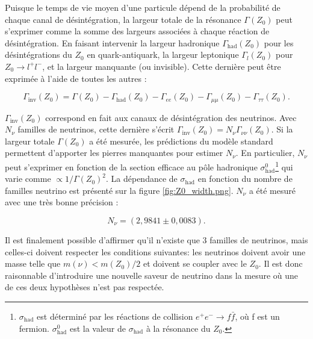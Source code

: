 \bigbreak

Puisque le temps de vie moyen d'une particule dépend de la probabilité de chaque canal de désintégration, la largeur totale de la résonance $\Gamma(Z_0)$ peut s'exprimer comme la somme des largeurs associées à chaque réaction de désintégration. En faisant intervenir la largeur hadronique $\Gamma_\textrm{had}(Z_0)$ pour les désintégrations du $Z_0$ en quark-antiquark, la largeur leptonique $\Gamma_l(Z_0)$ pour $Z_0 \rightarrow l^+l^-$, et la largeur manquante (ou invisible). Cette dernière peut être exprimée à l'aide de toutes les autres :

\begin{equation}
    \Gamma_\textrm{inv}(Z_0) = \Gamma(Z_0) - \Gamma_\textrm{had}(Z_0) - \Gamma_{ee}(Z_0) - \Gamma_{\mu\mu}(Z_0) - \Gamma_{\tau\tau}(Z_0).
\end{equation}

\bigbreak

$\Gamma_\textrm{inv}(Z_0)$ correspond en fait aux canaux de désintégration des neutrinos. Avec $N_\nu$ familles de neutrinos, cette dernière s'écrit $\Gamma_\textrm{inv}(Z_0) = N_\nu \Gamma_{\nu\nu}(Z_0)$. Si la largeur totale $\Gamma(Z_0)$ a été mesurée, les prédictions du modèle standard permettent d'apporter les pierres manquantes pour estimer $N_\nu$. En particulier, $N_\nu$ peut s'exprimer en fonction de la section efficace au pôle hadronique $\sigma_\textrm{had}^0$\footnote{$\sigma_\textrm{had}$ est déterminé par les réactions de collision $e^+e^- \rightarrow f\bar{f}$, où f est un fermion. $\sigma_\textrm{had}^0$ est la valeur de $\sigma_\textrm{had}$ à la résonance du $Z_0$.} qui varie comme $\propto 1/\Gamma(Z_0)^2$. La dépendance de $\sigma_\textrm{had}$ en fonction du nombre de familles neutrino est présenté sur la figure \ref{fig:Z0_width.png}. $N_\nu$ a été mesuré avec une très bonne précision :

\begin{equation}
    N_\nu = \left(2,9841 \pm 0,0083 \right).
\end{equation}

\bigbreak

Il est finalement possible d'affirmer qu'il n'existe que 3 familles de neutrinos, mais celles-ci doivent respecter les conditions suivantes: les neutrinos doivent avoir une masse telle que $m(\nu) < m(Z_0)/2$ et doivent se coupler avec le $Z_0$. Il est donc raisonnable d'introduire une nouvelle saveur de neutrino dans la mesure où une de ces deux hypothèses n'est pas respectée.

